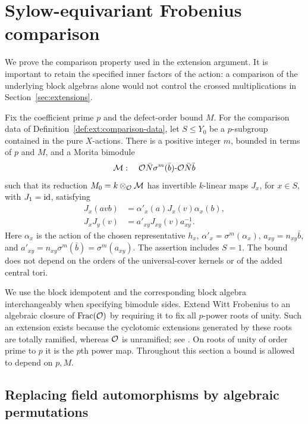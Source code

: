 \section{Sylow-equivariant Frobenius comparison}\label{sec:periodicity}

We prove the comparison property used in the extension argument.  It is
important to retain the specified inner factors of the action: a comparison
of the underlying block algebras alone would not control the crossed
multiplications in Section~\ref{sec:extensions}.

\begin{proposition}\label{prop:sylow-comparison}
Fix the coefficient prime $p$ and the defect-order bound $M$.
For the comparison data of Definition~\ref{def:ext:comparison-data}, let
$S\leq Y_0$ be a $p$-subgroup contained in the pure $X$-actions.  There is a
positive integer $m$, bounded in terms of $p$ and $M$, and a Morita
bimodule
\[
 \mathcal M:\quad
 \mathcal O\bar N\sigma^m(\bar b)\text{-}\mathcal O\bar N\bar b
\]
such that its reduction $M_0=k\otimes_{\mathcal O}\mathcal M$ has invertible
$k$-linear maps $J_x$, for $x\in S$, with $J_1=\operatorname{id}$, satisfying
\begin{align}
 J_x(avb)&=\alpha'_x(a)J_x(v)\alpha_x(b),
       \label{per:covariance}\\
 J_xJ_y(v)&=a'_{xy}J_{xy}(v)a_{xy}^{-1}.
       \label{per:factor-law}
\end{align}
Here $\alpha_x$ is the action of the chosen representative $h_x$,
$\alpha'_x=\sigma^m(\alpha_x)$,
$a_{xy}=n_{xy}\bar b$, and
$a'_{xy}=n_{xy}\sigma^m(\bar b)=\sigma^m(a_{xy})$.
The assertion includes $S=1$.  The bound does not depend on the orders of
the universal-cover kernels or of the added central tori.
\end{proposition}

We use the block idempotent and the corresponding block algebra
interchangeably when specifying bimodule sides.  Extend Witt Frobenius to
an algebraic closure of $\operatorname{Frac}(\mathcal O)$ by requiring it to fix
all $p$-power roots of unity.  Such an extension exists because the
cyclotomic extensions generated by these roots are totally ramified,
whereas $\mathcal O$ is unramified; see \cite[Lemma~2.2]{FarrellKessar}.
On roots of unity of order prime to $p$ it is the $p$th power map.
Throughout this section a bound is allowed to depend on $p,M$.

\subsection{Replacing field automorphisms by algebraic permutations}

